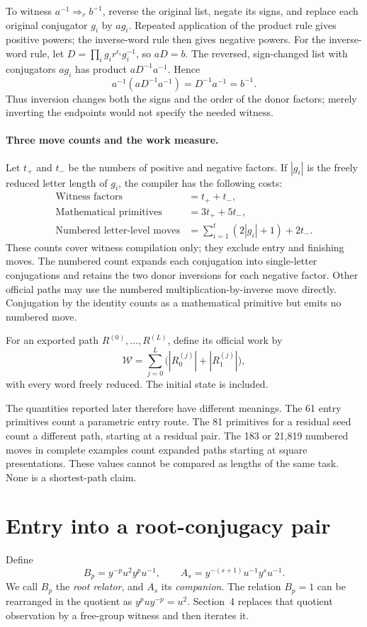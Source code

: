 \documentclass[11pt]{article}
\theoremstyle{definition}\newtheorem{definition}[theorem]{Definition}
\theoremstyle{remark}\newtheorem{remark}[theorem]{Remark}
\newcommand{\wit}[1]{\mathrel{\Longrightarrow_{#1}}}
\begin{document}
To witness $a^{-1}\wit r b^{-1}$, reverse the original list, negate its signs, and replace each original conjugator $g_i$ by $ag_i$. Repeated application of the product rule gives positive powers; the inverse-word rule then gives negative powers. For the inverse-word rule, let $D=\prod_i g_i r^{\epsilon_i}g_i^{-1}$, so $aD=b$. The reversed, sign-changed list with conjugators $ag_i$ has product $aD^{-1}a^{-1}$. Hence
\[
a^{-1}(aD^{-1}a^{-1})=D^{-1}a^{-1}=b^{-1}.
\]
Thus inversion changes both the signs and the order of the donor factors; merely inverting the endpoints would not specify the needed witness.

\paragraph{Three move counts and the work measure.}
Let $t_+$ and $t_-$ be the numbers of positive and negative factors. If $|g_i|$ is the freely reduced letter length of $g_i$, the compiler has the following costs:
\[
\begin{aligned}
\text{Witness factors}&=t_++t_-,\\
\text{Mathematical primitives}&=3t_++5t_-,\\
\text{Numbered letter-level moves}&=\sum_{i=1}^t(2|g_i|+1)+2t_-.
\end{aligned}
\]
These counts cover witness compilation only; they exclude entry and finishing moves. The numbered count expands each conjugation into single-letter conjugations and retains the two donor inversions for each negative factor. Other official paths may use the numbered multiplication-by-inverse move directly. Conjugation by the identity counts as a mathematical primitive but emits no numbered move.

For an exported path $R^{(0)},\ldots,R^{(L)}$, define its official work by
\[
\mathcal W=\sum_{j=0}^L\bigl(|R_0^{(j)}|+|R_1^{(j)}|\bigr),
\]
with every word freely reduced. The initial state is included.

The quantities reported later therefore have different meanings. The 61 entry primitives count a parametric entry route. The 81 primitives for a residual seed count a different path, starting at a residual pair. The 183 or 21,819 numbered moves in complete examples count expanded paths starting at square presentations. These values cannot be compared as lengths of the same task. None is a shortest-path claim.

\section{Entry into a root-conjugacy pair}
Define
\begin{equation}\label{eq:roots}
B_p=y^{-p}u^2y^pu^{-1},\qquad A_s=y^{-(s+1)}u^{-1}y^su^{-1}.
\end{equation}
We call $B_p$ the \emph{root relator}, and $A_s$ its \emph{companion}. The relation $B_p=1$ can be rearranged in the quotient as $y^puy^{-p}=u^2$. Section~4 replaces that quotient observation by a free-group witness and then iterates it.
\end{document}
